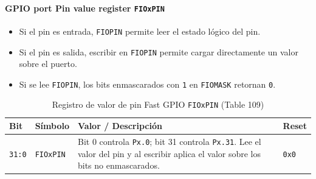 \paragraph{GPIO port Pin value register \texttt{FIOxPIN}}
\begin{itemize}
  \item Si el pin es entrada, \texttt{FIOPIN} permite leer el estado lógico del pin.
  \item Si el pin es salida, escribir en \texttt{FIOPIN} permite cargar directamente un valor sobre el puerto.
  \item Si se lee \texttt{FIOPIN}, los bits enmascarados con \texttt{1} en \texttt{FIOMASK} retornan \texttt{0}.
\end{itemize}

\begin{table}[H]
  \centering
  \small
  \caption{Registro de valor de pin Fast GPIO \texttt{FIOxPIN} (Table 109)}
  \begin{tabularx}{0.96\textwidth}{|>{\centering\arraybackslash}p{}|>{\raggedright\arraybackslash}p{}|>{\raggedright\arraybackslash}X|>{\centering\arraybackslash}p{}|}
    \hline
    \textbf{Bit} & \textbf{Símbolo} & \textbf{Valor / Descripción} & \textbf{Reset} \\
    \hline
    \texttt{31:0} & \texttt{FIOxPIN} & Bit 0 controla \texttt{Px.0}; bit 31 controla \texttt{Px.31}. Lee el valor del pin y al escribir aplica el valor sobre los bits no enmascarados. & \texttt{0x0} \\
    \hline
  \end{tabularx}
\end{table}

